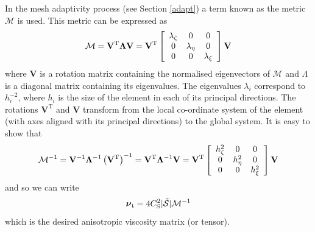 In the mesh adaptivity process (see Section \ref{adapt}) a term
known as the metric $\mathcal{M}$ is used. This metric can be
expressed as
\begin{equation}
\mathcal{M} = \mathbf{V}^{\textrm{T}} \mbox{\boldmath$\Lambda$}
\mathbf{V} = \mathbf{V}^{\textrm{T}} \left[ \begin{array}{ccc}
\lambda_\zeta & 0 & 0 \\
0 & \lambda_\eta & 0 \\
0 & 0 & \lambda_\xi
\end{array} \right] \mathbf{V}
\end{equation}
where $\mathbf{V}$ is a rotation matrix containing the normalised
eigenvectors of $\mathcal{M}$ and {\boldmath$\Lambda$} is a
diagonal matrix containing its eigenvalues. The eigenvalues
$\lambda_i$ correspond to $h_i^{-2}$, where $h_i$ is the size of
the element in each of its principal directions. The rotations
$\mathbf{V}^{\textrm{T}}$ and $\mathbf{V}$ transform from the
local co-ordinate system of the element (with axes aligned with
its principal directions) to the global system. It is easy to show
that
\begin{equation}
\mathcal{M}^{-1} = \mathbf{V}^{-1}\mbox{\boldmath$\Lambda$}^{-1}
\left(\mathbf{V}^{\textrm{T}} \right)^{-1} =
\mathbf{V}^{\textrm{T}} \mbox{\boldmath$\Lambda$}^{-1} \mathbf{V}
= \mathbf{V}^{\textrm{T}} \left[ \begin{array}{ccc}
h_\zeta^2 & 0 & 0 \\
0 & h_\eta^2 & 0 \\
0 & 0 & h_\xi^2
\end{array} \right] \mathbf{V}
\end{equation}
and so we can write
\begin{equation}
\mbox{\boldmath $\nu$}_{\textrm{t}} =
4C_{\textrm{S}}^2|\tilde{\mathcal{S}}| \mathcal{M}^{-1}
\end{equation}
which is the desired anisotropic viscosity matrix (or tensor).

